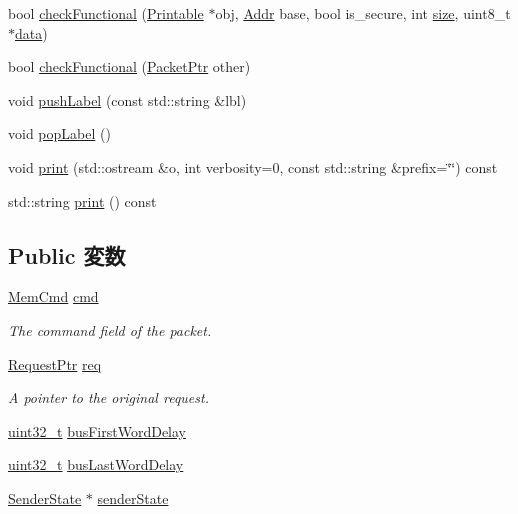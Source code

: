 \begin{DoxyCompactItemize}
\item 
bool \hyperlink{classPacket_a77410f93ce8057ce67882c121ac2e667}{checkFunctional} (\hyperlink{classPrintable}{Printable} $\ast$obj, \hyperlink{base_2types_8hh_af1bb03d6a4ee096394a6749f0a169232}{Addr} base, bool is\_\-secure, int \hyperlink{classPacket_a245260f6f74972558f61b85227df5aae}{size}, uint8\_\-t $\ast$\hyperlink{classPacket_a60f451ea06dccaf49b32633f67e7b16e}{data})
\item 
bool \hyperlink{classPacket_ab27966f94fe8860e3845815fd4b8da7f}{checkFunctional} (\hyperlink{classPacket}{PacketPtr} other)
\item 
void \hyperlink{classPacket_ad2656c333949d4b445823d47398829f2}{pushLabel} (const std::string \&lbl)
\item 
void \hyperlink{classPacket_a3ab6da7065be0d85f45a8dd050515f16}{popLabel} ()
\item 
void \hyperlink{classPacket_ae31e5ec0b459f751b386d17dd75855d1}{print} (std::ostream \&o, int verbosity=0, const std::string \&prefix=\char`\"{}\char`\"{}) const 
\item 
std::string \hyperlink{classPacket_ae8a5b5e9e0e6be3b115ee77fa7b4d0c8}{print} () const 
\end{DoxyCompactItemize}
\subsection*{Public 変数}
\begin{DoxyCompactItemize}
\item 
\hyperlink{classMemCmd}{MemCmd} \hyperlink{classPacket_af88eb56d484b750933cd2ea86594f001}{cmd}
\begin{DoxyCompactList}\small\item\em The command field of the packet. \item\end{DoxyCompactList}\item 
\hyperlink{classRequest}{RequestPtr} \hyperlink{classPacket_a956cd41d82347558b9c0a5b0474903f2}{req}
\begin{DoxyCompactList}\small\item\em A pointer to the original request. \item\end{DoxyCompactList}\item 
\hyperlink{Type_8hh_a435d1572bf3f880d55459d9805097f62}{uint32\_\-t} \hyperlink{classPacket_af8986a05caa6c5b96b0b01bb6cf47772}{busFirstWordDelay}
\item 
\hyperlink{Type_8hh_a435d1572bf3f880d55459d9805097f62}{uint32\_\-t} \hyperlink{classPacket_a7bf8ae0a056329f751eda8b39ca4c268}{busLastWordDelay}
\item 
\hyperlink{structPacket_1_1SenderState}{SenderState} $\ast$ \hyperlink{classPacket_a983ade0479f946c813284dcc65073367}{senderState}
\end{DoxyCompactItemize}

